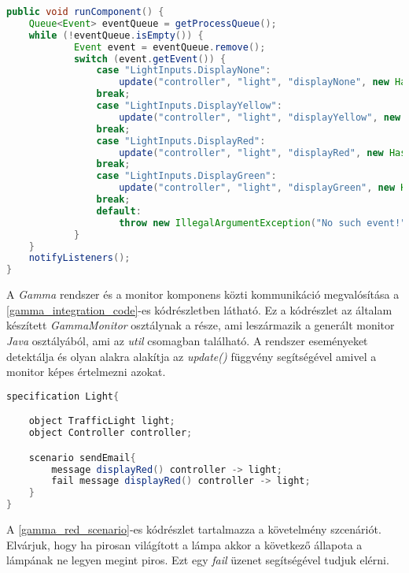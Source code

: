 \begin{lstlisting}[language=java, frame=single, float=ht!, caption={Monitor komponenshez tartozó kódrészlet.},captionpos=b,label=gamma_integration_code]
public void runComponent() {
    Queue<Event> eventQueue = getProcessQueue();
    while (!eventQueue.isEmpty()) {
            Event event = eventQueue.remove();
            switch (event.getEvent()) {
                case "LightInputs.DisplayNone":
                    update("controller", "light", "displayNone", new HashMap<String, Object>());
                break;
                case "LightInputs.DisplayYellow":
                    update("controller", "light", "displayYellow", new HashMap<String, Object>());
                break;
                case "LightInputs.DisplayRed":
                    update("controller", "light", "displayRed", new HashMap<String, Object>());
                break;
                case "LightInputs.DisplayGreen":
                    update("controller", "light", "displayGreen", new HashMap<String, Object>());
                break;
                default:
                    throw new IllegalArgumentException("No such event!");
            }
    }
    notifyListeners();
}
\end{lstlisting}

A \textit{Gamma} rendszer és a monitor komponens közti kommunikáció megvalósítása a \ref{gamma_integration_code}-es kódrészletben látható.
Ez a kódrészlet az általam készített \textit{GammaMonitor} osztálynak a része, ami leszármazik a generált monitor \textit{Java} osztályából, ami az \textit{util} csomagban található.
A rendszer eseményeket detektálja és olyan alakra alakítja az \textit{update()} függvény segítségével amivel a monitor képes értelmezni azokat.

\begin{lstlisting}[language=java, frame=single, float=ht!, caption={Szenárió szöveges leírása.},captionpos=b, label=gamma_red_scenario]
specification Light{

    object TrafficLight light;
    object Controller controller;

    scenario sendEmail{
        message displayRed() controller -> light;
        fail message displayRed() controller -> light;
    }
}
\end{lstlisting}

A \ref{gamma_red_scenario}-es kódrészlet tartalmazza a követelmény szcenáriót.
Elvárjuk, hogy ha pirosan világított a lámpa akkor a következő állapota a lámpának ne legyen megint piros.
Ezt egy \textit{fail} üzenet segítségével tudjuk elérni.

